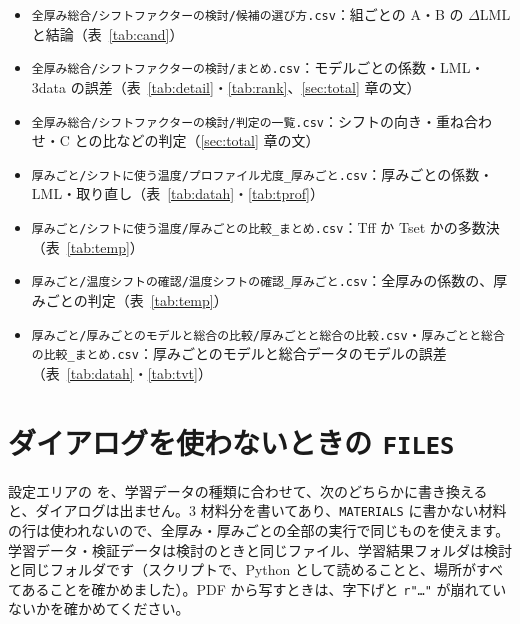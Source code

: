 \documentclass[paper=a4paper,fontsize=10.5pt,line_length=44zw,number_of_lines=40]{jlreq}
\newcommand{\mdl}[1]{\texttt{\detokenize{#1}}}
\begin{document}
\begin{itemize}[itemsep=0.2ex,topsep=0.4ex]
\item \texttt{全厚み総合/\allowbreak{}シフトファクターの検討/\allowbreak{}候補の選び方.csv}：組ごとの A・B の $\Delta$LML と結論（表~\ref{tab:cand}）
\item \texttt{全厚み総合/\allowbreak{}シフトファクターの検討/\allowbreak{}まとめ.csv}：モデルごとの係数・LML・3data の誤差（表~\ref{tab:detail}・\ref{tab:rank}、\ref{sec:total} 章の文）
\item \texttt{全厚み総合/\allowbreak{}シフトファクターの検討/\allowbreak{}判定の一覧.csv}：シフトの向き・重ね合わせ・C との比などの判定（\ref{sec:total} 章の文）
\item \texttt{厚みごと/\allowbreak{}シフトに使う温度/\allowbreak{}プロファイル尤度\_\allowbreak{}厚みごと.csv}：厚みごとの係数・LML・取り直し（表~\ref{tab:datah}・\ref{tab:tprof}）
\item \texttt{厚みごと/\allowbreak{}シフトに使う温度/\allowbreak{}厚みごとの比較\_\allowbreak{}まとめ.csv}：Tff か Tset かの多数決（表~\ref{tab:temp}）
\item \texttt{厚みごと/\allowbreak{}温度シフトの確認/\allowbreak{}温度シフトの確認\_\allowbreak{}厚みごと.csv}：全厚みの係数の、厚みごとの判定（表~\ref{tab:temp}）
\item \texttt{厚みごと/\allowbreak{}厚みごとのモデルと総合の比較/\allowbreak{}厚みごとと総合の比較.csv}・\texttt{厚みごとと総合の比較\_\allowbreak{}まとめ.csv}：厚みごとのモデルと総合データのモデルの誤差（表~\ref{tab:datah}・\ref{tab:tvt}）
\end{itemize}

\section{ダイアログを使わないときの \texttt{FILES}}\label{sec:files}
設定エリアの \mdl{FILES = {}} を、学習データの種類に合わせて、次のどちらかに書き換えると、ダイアログは出ません。3 材料分を書いてあり、\texttt{MATERIALS} に書かない材料の行は使われないので、全厚み・厚みごとの全部の実行で同じものを使えます。学習データ・検証データは検討のときと同じファイル、学習結果フォルダは検討と同じフォルダです（スクリプトで、Python として読めることと、場所がすべてあることを確かめました）。PDF から写すときは、字下げと \texttt{r"…"} が崩れていないかを確かめてください。
\end{document}
